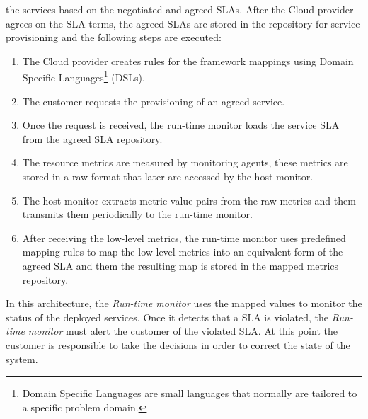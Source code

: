 the services based on the negotiated and agreed SLAs. After the Cloud provider agrees on the SLA terms, the
agreed SLAs are stored in the repository for service provisioning and the following steps are executed:
\begin{enumerate}
  \item The Cloud provider creates rules for the framework mappings using Domain Specific
  Languages\footnote{Domain Specific Languages are small languages that normally are tailored to a specific
  problem domain.} (DSLs).
  \item The customer requests the provisioning of an agreed service.
  \item Once the request is received, the run-time monitor loads the service SLA from the agreed SLA repository.
  \item The resource metrics are measured by monitoring agents, these metrics are stored in a raw format that
  later are accessed by the host monitor.
  \item The host monitor extracts metric-value pairs from the raw metrics and them transmits them periodically to
  the run-time monitor.
  \item After receiving the low-level metrics, the run-time monitor uses predefined mapping rules to map the
  low-level metrics into an equivalent form of the agreed SLA and them the resulting map is stored in the
  mapped metrics repository.
\end{enumerate}

In this architecture, the \textit{Run-time monitor} uses the mapped values to monitor the status of the deployed services. Once it detects that a SLA is violated, the \textit{Run-time monitor} must alert the customer of the violated SLA.
At this point the customer is responsible to take the decisions in order to correct the state of the system.
